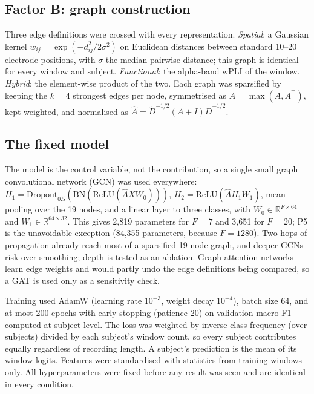 \subsection{Factor B: graph construction}\label{sec:graphs}
Three edge definitions were crossed with every representation. \emph{Spatial}: a Gaussian kernel
$w_{ij}=\exp(-d_{ij}^2/2\sigma^2)$ on Euclidean distances between standard 10--20 electrode positions,
with $\sigma$ the median pairwise distance; this graph is identical for every window and subject.
\emph{Functional}: the alpha-band wPLI of the window. \emph{Hybrid}: the element-wise product of the
two. Each graph was sparsified by keeping the $k=4$ strongest edges per node, symmetrised as
$A=\max(A,A^\top)$, kept weighted, and normalised as $\hat A = \tilde D^{-1/2}(A+I)\tilde D^{-1/2}$.

\subsection{The fixed model}\label{sec:model}
The model is the control variable, not the contribution, so a single small graph convolutional
network (GCN) \cite{F13} was used everywhere:
$H_1=\mathrm{Dropout}_{0.5}(\mathrm{BN}(\mathrm{ReLU}(\hat A X W_0)))$,
$H_2=\mathrm{ReLU}(\hat A H_1 W_1)$, mean pooling over the 19 nodes, and a linear layer to three
classes, with $W_0\in\mathbb{R}^{F\times64}$ and $W_1\in\mathbb{R}^{64\times32}$. This gives 2,819
parameters for $F=7$ and 3,651 for $F=20$; P5 is the unavoidable exception (84,355 parameters,
because $F=1280$). Two hops of propagation already reach most of a sparsified 19-node graph, and
deeper GCNs risk over-smoothing; depth is tested as an ablation. Graph attention networks
\cite{gat} learn edge weights and would partly undo the edge definitions being compared, so a GAT
is used only as a sensitivity check.

Training used AdamW (learning rate $10^{-3}$, weight decay $10^{-4}$), batch size 64, and at most
200 epochs with early stopping (patience 20) on validation macro-F1 computed at subject level. The
loss was weighted by inverse class frequency (over subjects) divided by each subject's window count,
so every subject contributes equally regardless of recording length. A subject's prediction is the
mean of its window logits. Features were standardised with statistics from training windows only.
All hyperparameters were fixed before any result was seen and are identical in every condition.

